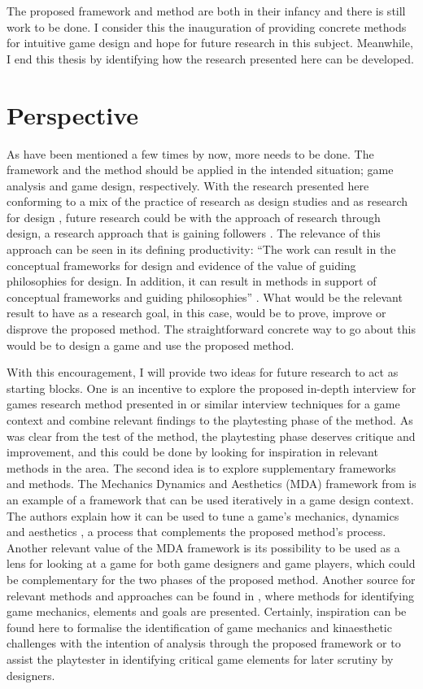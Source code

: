 The proposed framework and method are both in their infancy and there is still work to be done. I consider this the inauguration of providing concrete methods for intuitive game design and hope for future research in this subject. Meanwhile, I end this thesis by identifying how the research presented here can be developed.

\section{Perspective}
As have been mentioned a few times by now, more needs to be done. The framework and the method should be applied in the intended situation; game analysis and game design, respectively. With the research presented here conforming to a mix of the practice of research as design studies \cite{rigour} and as research for design \cite{designtotheory}, future research could be with the approach of research through design, a research approach that is gaining followers \cite{rthroughd, designtotheory}. The relevance of this approach can be seen in its defining productivity: ``The work can result in the conceptual frameworks for design and evidence of the value of guiding philosophies for design. In addition, it can result in methods in support of conceptual frameworks and guiding philosophies'' \cite[p. 2894]{designtotheory}. What would be the relevant result to have as a research goal, in this case, would be to prove, improve or disprove the proposed method. The straightforward concrete way to go about this would be to design a game and use the proposed method.

With this encouragement, I will provide two ideas for future research to act as starting blocks. One is an incentive to explore the proposed in-depth interview for games research method presented in  or similar interview techniques for a game context and combine relevant findings to the playtesting phase of the method. As was clear from the test of the method, the playtesting phase deserves critique and improvement, and this could be done by looking for inspiration in relevant methods in the area. The second idea is to explore supplementary frameworks and methods. The Mechanics Dynamics and Aesthetics (MDA) framework from  is an example of a framework that can be used iteratively in a game design context. The authors explain how it can be used to tune a game's mechanics, dynamics and aesthetics \cite{mda}, a process that complements the proposed method's process. Another relevant value of the MDA framework is its possibility to be used as a lens for looking at a game for both game designers and game players, which could be complementary for the two phases of the proposed method. Another source for relevant methods and approaches can be found in , where methods for identifying game mechanics, elements and goals are presented. Certainly, inspiration can be found here to formalise the identification of game mechanics and kinaesthetic challenges with the intention of analysis through the proposed framework or to assist the playtester in identifying critical game elements for later scrutiny by designers.

